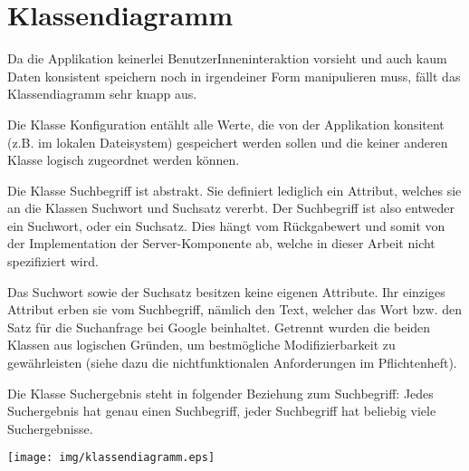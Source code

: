\section{Klassendiagramm}
\label{sec:klassendiagramm}

Da die Applikation keinerlei BenutzerInneninteraktion vorsieht und auch kaum
Daten konsistent speichern noch in irgendeiner Form manipulieren muss, fällt das
Klassendiagramm sehr knapp aus.

Die Klasse Konfiguration entählt alle Werte, die von der Applikation konsitent
(z.B. im lokalen Dateisystem) gespeichert werden sollen und die keiner anderen
Klasse logisch zugeordnet werden können.

Die Klasse Suchbegriff ist abstrakt. Sie definiert lediglich ein Attribut,
welches sie an die Klassen Suchwort und Suchsatz vererbt. Der Suchbegriff ist
also entweder ein Suchwort, oder ein Suchsatz. Dies hängt vom Rückgabewert und
somit von der Implementation der Server-Komponente ab, welche in dieser Arbeit
nicht spezifiziert wird.

Das Suchwort sowie der Suchsatz besitzen keine eigenen Attribute. Ihr einziges
Attribut erben sie vom Suchbegriff, nämlich den Text, welcher das Wort bzw.
den Satz für die Suchanfrage bei Google beinhaltet. Getrennt wurden die beiden
Klassen aus logischen Gründen, um bestmögliche Modifizierbarkeit zu
gewährleisten (siehe dazu die nichtfunktionalen Anforderungen im Pflichtenheft).

Die Klasse Suchergebnis steht in folgender Beziehung zum Suchbegriff: Jedes
Suchergebnis hat genau einen Suchbegriff, jeder Suchbegriff hat beliebig viele
Suchergebnisse.
\\[\intextsep]
\begin{minipage}{\linewidth}
\centering%
\texttt{[image: img/klassendiagramm.eps]}%
%
\label{fig:klassendiagramm}%
\end{minipage}
